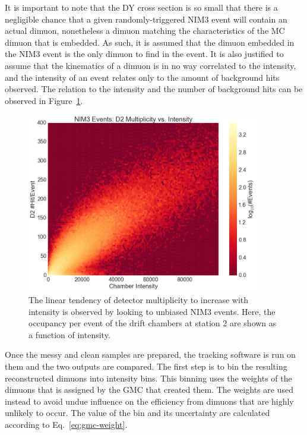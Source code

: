 It is important to note that the DY cross section is so small that there is a negligible chance that a given randomly-triggered NIM3 event will contain an actual dimuon, nonetheless a dimuon matching the characteristics of the MC dimuon that is embedded. As such, it is assumed that the dimuon embedded in the NIM3 event is the only dimuon to find in the event. It is also justified to assume that the kinematics of a dimuon is in no way correlated to the intensity, and the intensity of an event relates only to the amount of background hits observed. The relation to the intensity and the number of background hits can be observed in Figure~\ref{fig:NIM3-Int-Mult}.

\begin{figure}
	\centering
	\includegraphics[width=4in]{figures/analysis/NIM3-Int-Mult.png}
	\caption{The linear tendency of detector multiplicity to increase with intensity is observed by looking to unbiased NIM3 events. Here, the occupancy per event of the drift chambers at station 2 are shown as a function of intensity.}
	\label{fig:NIM3-Int-Mult}
\end{figure}

Once the messy and clean samples are prepared, the tracking software is run on them and the two outputs are compared. The first step is to bin the resulting reconstructed dimuons into intensity bins. This binning uses the weights of the dimuons that is assigned by the GMC that created them. The weights are used instead to avoid undue influence on the efficiency from dimuons that are highly unlikely to occur. The value of the bin and its uncertainty are calculated according to Eq.~\ref{eq:gmc-weight}.

